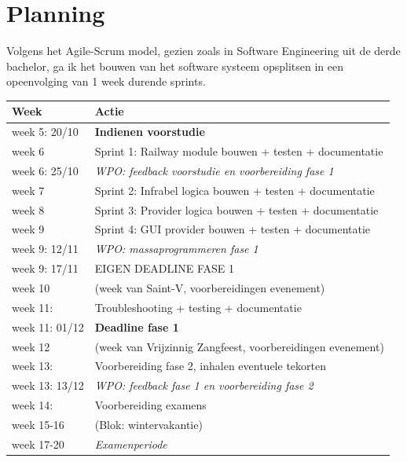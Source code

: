 \documentclass[a4paper, 11pt]{article}
\newcommand{\<}{\scriptsize\textless\normalsize}
\renewcommand{\>}{\scriptsize\textgreater\normalsize}
\begin{document}
\newpage

\section{Planning} %
Volgens het Agile-Scrum model, gezien zoals in Software Engineering uit de derde bachelor, ga ik het bouwen van het software systeem opsplitsen in een opeenvolging van 1 week durende sprints.
\begin{table}[H]
	\begin{center}
		\begin{tabular}{|l l|}
			\hline
			\textbf{Week} & \textbf{Actie} \\
			\hline
			week 5: 20/10 & \textbf{Indienen voorstudie}\\
			week 6 & Sprint 1: Railway module bouwen + testen + documentatie\\
			week 6: 25/10& \emph{WPO: feedback voorstudie en voorbereiding fase 1}\\
			week 7 & Sprint 2: Infrabel logica bouwen + testen + documentatie\\
			week 8 & Sprint 3: Provider logica bouwen + testen + documentatie\\
			week 9 & Sprint 4: GUI provider bouwen + testen + documentatie\\
			week 9: 12/11 & \emph{WPO: massaprogrammeren fase 1}\\
			\hline
			week 9: 17/11 & EIGEN DEADLINE FASE 1\\
			week 10 & (week van Saint-V, voorbereidingen evenement)\\
			week 11: & Troubleshooting + testing + documentatie\\
			week 11: 01/12 & \textbf{Deadline fase 1}\\
			\hline
			week 12 & (week van Vrijzinnig Zangfeest, voorbereidingen evenement)\\
			week 13: & Voorbereiding fase 2, inhalen eventuele tekorten\\
			week 13: 13/12 & \emph{WPO: feedback fase 1 en voorbereiding fase 2}\\
			week 14: & Voorbereiding examens\\
			\hline
			\hline
			week 15-16 & (Blok: wintervakantie)\\
			week 17-20 & \emph{Examenperiode}\\

\end{tabular}
\end{center}
\end{table}
\end{document}
